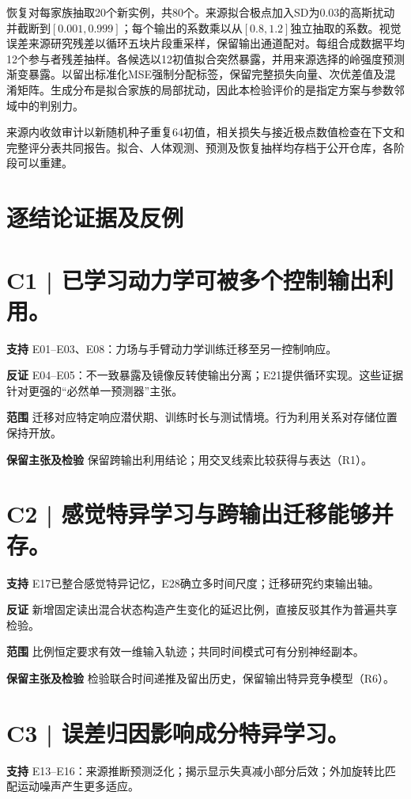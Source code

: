 \documentclass[11pt,a4paper]{article}
\begin{document}
恢复对每家族抽取20个新实例，共80个。来源拟合极点加入SD为0.03的高斯扰动并截断到$[0.001,0.999]$；每个输出的系数乘以从$[0.8,1.2]$独立抽取的系数。视觉误差来源研究残差以循环五块片段重采样，保留输出通道配对。每组合成数据平均12个参与者残差抽样。各候选以12初值拟合突然暴露，并用来源选择的岭强度预测渐变暴露。以留出标准化MSE强制分配标签，保留完整损失向量、次优差值及混淆矩阵。生成分布是拟合家族的局部扰动，因此本检验评价的是指定方案与参数邻域中的判别力。

来源内收敛审计以新随机种子重复64初值，相关损失与接近极点数值检查在下文和完整评分表共同报告。拟合、人体观测、预测及恢复抽样均存档于公开仓库，各阶段可以重建。
\clearpage\section{逐结论证据及反例}
\medskip\section{C1 | 已学习动力学可被多个控制输出利用。}
\textbf{支持} E01--E03、E08：力场与手臂动力学训练迁移至另一控制响应。\par
\textbf{反证} E04--E05：不一致暴露及镜像反转使输出分离；E21提供循环实现。这些证据针对更强的“必然单一预测器”主张。\par
\textbf{范围} 迁移对应特定响应潜伏期、训练时长与测试情境。行为利用关系对存储位置保持开放。\par
\textbf{保留主张及检验} 保留跨输出利用结论；用交叉线索比较获得与表达（R1）。\par
\medskip\section{C2 | 感觉特异学习与跨输出迁移能够并存。}
\textbf{支持} E17已整合感觉特异记忆，E28确立多时间尺度；迁移研究约束输出轴。\par
\textbf{反证} 新增固定读出混合状态构造产生变化的延迟比例，直接反驳其作为普遍共享检验。\par
\textbf{范围} 比例恒定要求有效一维输入轨迹；共同时间模式可有分别神经副本。\par
\textbf{保留主张及检验} 检验联合时间递推及留出历史，保留输出特异竞争模型（R6）。\par
\clearpage\section{C3 | 误差归因影响成分特异学习。}
\textbf{支持} E13--E16：来源推断预测泛化；揭示显示失真减小部分后效；外加旋转比匹配运动噪声产生更多适应。\par
\end{document}
